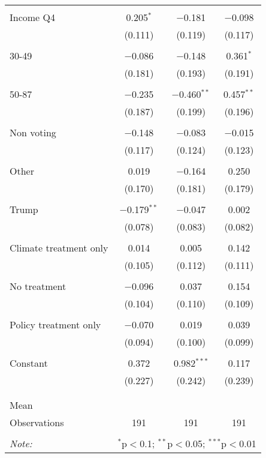 \begin{tabular}{@{\extracolsep{5pt}}lccc}
  & & & \\ 
 Income Q4 & 0.205$^{*}$ & $-$0.181 & $-$0.098 \\ 
  & (0.111) & (0.119) & (0.117) \\ 
  & & & \\ 
 30-49 & $-$0.086 & $-$0.148 & 0.361$^{*}$ \\ 
  & (0.181) & (0.193) & (0.191) \\ 
  & & & \\ 
 50-87 & $-$0.235 & $-$0.460$^{**}$ & 0.457$^{**}$ \\ 
  & (0.187) & (0.199) & (0.196) \\ 
  & & & \\ 
 Non voting & $-$0.148 & $-$0.083 & $-$0.015 \\ 
  & (0.117) & (0.124) & (0.123) \\ 
  & & & \\ 
 Other & 0.019 & $-$0.164 & 0.250 \\ 
  & (0.170) & (0.181) & (0.179) \\ 
  & & & \\ 
 Trump & $-$0.179$^{**}$ & $-$0.047 & 0.002 \\ 
  & (0.078) & (0.083) & (0.082) \\ 
  & & & \\ 
 Climate treatment only & 0.014 & 0.005 & 0.142 \\ 
  & (0.105) & (0.112) & (0.111) \\ 
  & & & \\ 
 No treatment & $-$0.096 & 0.037 & 0.154 \\ 
  & (0.104) & (0.110) & (0.109) \\ 
  & & & \\ 
 Policy treatment only & $-$0.070 & 0.019 & 0.039 \\ 
  & (0.094) & (0.100) & (0.099) \\ 
  & & & \\ 
 Constant & 0.372 & 0.982$^{***}$ & 0.117 \\ 
  & (0.227) & (0.242) & (0.239) \\ 
  & & & \\ 
\hline \\[-1.8ex] 
Mean &  &  &  \\ 
Observations & 191 & 191 & 191 \\ 
\hline 
\hline \\[-1.8ex] 
\textit{Note:}  & \multicolumn{3}{r}{$^{*}$p$<$0.1; $^{**}$p$<$0.05; $^{***}$p$<$0.01} \\ 
\end{tabular} 
